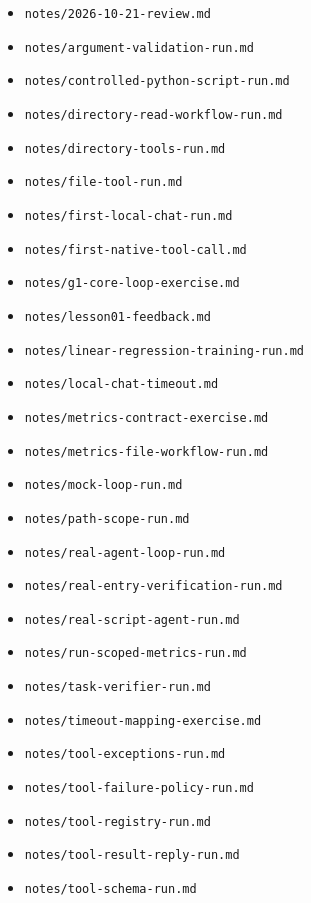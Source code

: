 \documentclass[UTF8,zihao=-4,fontset=fandol]{ctexart}
\begin{document}
\begin{itemize}
\item \nolinkurl{notes/2026-10-21-review.md}
\item \nolinkurl{notes/argument-validation-run.md}
\item \nolinkurl{notes/controlled-python-script-run.md}
\item \nolinkurl{notes/directory-read-workflow-run.md}
\item \nolinkurl{notes/directory-tools-run.md}
\item \nolinkurl{notes/file-tool-run.md}
\item \nolinkurl{notes/first-local-chat-run.md}
\item \nolinkurl{notes/first-native-tool-call.md}
\item \nolinkurl{notes/g1-core-loop-exercise.md}
\item \nolinkurl{notes/lesson01-feedback.md}
\item \nolinkurl{notes/linear-regression-training-run.md}
\item \nolinkurl{notes/local-chat-timeout.md}
\item \nolinkurl{notes/metrics-contract-exercise.md}
\item \nolinkurl{notes/metrics-file-workflow-run.md}
\item \nolinkurl{notes/mock-loop-run.md}
\item \nolinkurl{notes/path-scope-run.md}
\item \nolinkurl{notes/real-agent-loop-run.md}
\item \nolinkurl{notes/real-entry-verification-run.md}
\item \nolinkurl{notes/real-script-agent-run.md}
\item \nolinkurl{notes/run-scoped-metrics-run.md}
\item \nolinkurl{notes/task-verifier-run.md}
\item \nolinkurl{notes/timeout-mapping-exercise.md}
\item \nolinkurl{notes/tool-exceptions-run.md}
\item \nolinkurl{notes/tool-failure-policy-run.md}
\item \nolinkurl{notes/tool-registry-run.md}
\item \nolinkurl{notes/tool-result-reply-run.md}
\item \nolinkurl{notes/tool-schema-run.md}
\end{itemize}
\end{document}
